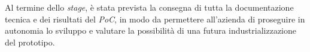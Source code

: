 Al termine dello \emph{stage}, è stata prevista la consegna di tutta la documentazione tecnica e dei risultati del \emph{PoC}, in modo da permettere all’azienda di proseguire in 
autonomia lo sviluppo e valutare la possibilità di una futura industrializzazione del prototipo.












